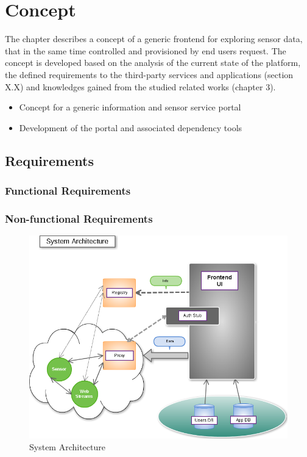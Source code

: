 \chapter{Concept}
     The chapter describes a concept of a generic frontend for exploring sensor data, 
     that in the same time controlled and provisioned by end users request. 
     The concept is developed based on the analysis of the current
     state of the platform, the defined requirements to the third-party services and applications
     (section X.X) and knowledges gained from the studied related works (chapter 3).

\begin{itemize}
     \item  Concept for a generic information and sensor service portal
      \item Development of the portal and associated dependency tools
\end{itemize}

\section{Requirements}

\subsection{Functional Requirements}

\subsection{Non-functional Requirements}

\begin{figure}[!ht]
\centering
\includegraphics[scale=0.5]{images/Structure.png}   %
\caption[System Architecture]{System Architecture}
\label{img:structure}                           %
\end{figure}

